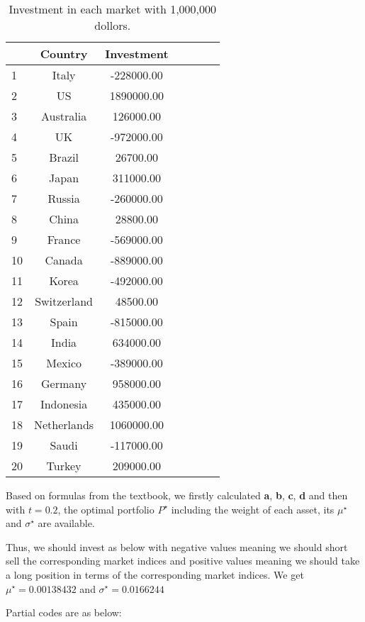 \documentclass[
]{article}
\begin{document}
\begin{table}[!htb]
\centering
{\begin{tabular}{lcccccc} 
  \hline
 & Country & Investment \\ 
  \hline
1 & Italy & -228000.00 \\ 
  2 & US & 1890000.00 \\ 
  3 & Australia & 126000.00 \\ 
  4 & UK & -972000.00 \\ 
  5 & Brazil & 26700.00 \\ 
  6 & Japan & 311000.00 \\ 
  7 & Russia & -260000.00 \\ 
  8 & China & 28800.00 \\ 
  9 & France & -569000.00 \\ 
  10 & Canada & -889000.00 \\ 
  11 & Korea & -492000.00 \\ 
  12 & Switzerland & 48500.00 \\ 
  13 & Spain & -815000.00 \\ 
  14 & India & 634000.00 \\ 
  15 & Mexico & -389000.00 \\ 
  16 & Germany & 958000.00 \\ 
  17 & Indonesia & 435000.00 \\ 
  18 & Netherlands & 1060000.00 \\ 
  19 & Saudi & -117000.00 \\ 
  20 & Turkey & 209000.00 \\ 
   \hline
\end{tabular}}
\caption{Investment in each market with 1,000,000 dollors.}
\label{money_invested}
\end{table}


Based on formulas from the textbook, we firstly calculated \textbf{a},
\textbf{b}, \textbf{c}, \textbf{d} and then with \emph{\(t=0.2\)}, the
optimal portfolio \(P^\star\) including the weight of each asset, its
\(\mu^{\star}\) and \(\sigma^{\star}\) are available.

Thus, we should invest as below with negative values meaning we should
short sell the corresponding market indices and positive values meaning
we should take a long position in terms of the corresponding market
indices. We get \(\mu^{\star} = 0.00138432\) and
\(\sigma^{\star} = 0.0166244\)

Partial codes are as below:
\end{document}
